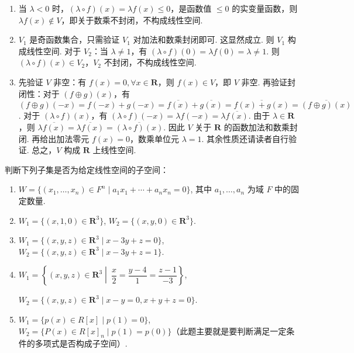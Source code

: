 \begin{exercise}
\begin{exgroup}
\begin{answer}
\begin{enumerate}
                        \item 当 $\lambda<0$ 时，$(\lambda\circ f)(x)=\lambda f(x)\leqslant 0$，是函数值 $\le0$ 的实变量函数，则 $\lambda f(x)\not\in V$，即关于数乘不封闭，不构成线性空间.

                        \item $V_1$ 是奇函数集合，只需验证 $V_1$ 对加法和数乘封闭即可. 这显然成立. 则 $V_1$ 构成线性空间. 对于 $V_2$：当 $\lambda\neq 1$，有 $(\lambda\circ f)(0)=\lambda f(0)=\lambda\neq 1$. 则 $(\lambda\circ f)(x)\in V_2$，$V_2$ 不封闭，不构成线性空间.

                        \item 先验证 $V$ 非空：有 $f(x)=0,\forall x\in \mathbf{R}$，则 $f(x)\in V$，即 $V$ 非空. 再验证封闭性：对于 $(f\oplus g)(x)$，有 $(f\oplus g)(-x)=f(-x)+g(-x)=\overline{f(x)}+\overline{g(x)}=\overline{f(x)+g(x)}=\overline{(f\oplus g)(x)}$. 对于 $(\lambda\circ f)(x)$，有 $(\lambda\circ f)(-x)=\lambda f(-x)=\lambda\overline{f(x)}$. 由于 $\lambda \in \mathbf{R}$，则 $\lambda \overline{f(x)}=\overline{\lambda f(x)}=\overline{(\lambda\circ f)(x)}$. 因此 $V$ 关于 $\mathbf{R}$ 的函数加法和数乘封闭. 再给出加法零元 $f(x)=0$，数乘单位元 $\lambda=1$. 其余性质还请读者自行验证. 总之，$V$ 构成 $\mathbf{R}$ 上线性空间.
            \end{enumerate}
        \end{answer}

        \item 判断下列子集是否为给定线性空间的子空间：
        \begin{enumerate}
            \item $W = \{(x_1,\ldots,x_n) \in F^n \mid a_1 x_1+\cdots +a_n x_n =0\}$, 其中 $a_1, \ldots, a_n$ 为域 $F$ 中的固定数量.

            \item $W_1 = \{(x,1,0) \in \mathbf{R}^3 \}$, $W_2 = \{(x,y,0) \in \mathbf{R}^3\}$.

            \item $W_1 = \{(x,y,z) \in \mathbf{R}^3 \mid x-3y+z = 0\}$, $W_2 = \{(x,y,z) \in \mathbf{R}^3 \mid x-3y+z = 1\}$.

            \item $W_1 = \left\{(x,y,z) \in \mathbf{R}^3 \middle|\ \dfrac{x}{2} = \dfrac{y-4}{1} = \dfrac{z-1}{-3}\right\}$,

                  $W_2 = \{(x,y,z) \in \mathbf{R}^3 \mid x-y = 0, x+y+z = 0\}$.

            \item $W_1 = \{p(x) \in R[x] \mid p(1) = 0\}$, $W_2 = \{P(x) \in R[x]_n \mid p(1) = p(0)\}$（此题主要就是要判断满足一定条件的多项式是否构成子空间）.


\end{enumerate}
\end{exgroup}
\end{exercise}
